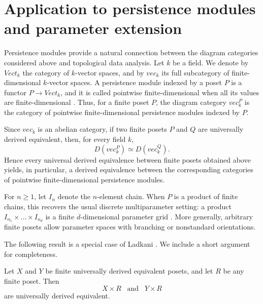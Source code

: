 \section{Application to persistence modules and parameter extension} \label{Application to persistence modules and parameter extension}
Persistence modules provide a natural connection between the diagram categories considered above and topological data analysis. Let $k$ be a field. We denote by $Vect_k$ the category of $k$-vector spaces, and by $vec_k$ its full subcategory of finite-dimensional $k$-vector spaces. A persistence module indexed by a poset $P$ is a functor $P \longrightarrow Vect_k$, and it is called pointwise finite-dimensional when all its values are finite-dimensional \cite[Section 2.3]{Botnan}. Thus, for a finite poset $P$, the diagram category $vec_k^P$ is the category of pointwise finite-dimensional persistence modules indexed by $P$.

Since $vec_k$ is an abelian category, if two finite posets $P$  and $Q$ are universally derived equivalent, then, for every field $k$, \[D(vec_k^P) \simeq D(vec_k^Q). \] Hence every universal derived equivalence between finite posets obtained above yields, in particular, a derived equivalence between the corresponding categories of pointwise finite-dimensional persistence modules.

For $n \geq 1$, let $I_n$ denote the $n$-element chain. 
When $P$ is a product of finite chains, this recovers the usual discrete multiparameter setting: a product $I_{n_1} \times \dots \times I_{n_d}$ is a finite $d$-dimensional parameter grid \cite[Sections 2.2-2.3]{Botnan}. More generally, arbitrary finite posets allow parameter spaces with branching or nonstandard orientations.


The following result is a special case of Ladkani \cite[Lemma 2.9]{ladkani}. We include a short argument for completeness.

\begin{proposition}%
\label{Stability under parameter extension}
    Let $X$ and $Y$ be finite universally derived equivalent posets, and let $R$ be any finite poset. Then
    \[X \times R \,\,\, \text{ and } \,\,\, Y \times R\] are universally derived equivalent.
\end{proposition}

